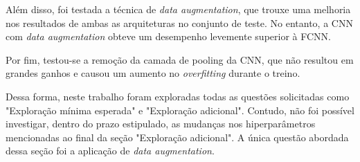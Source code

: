 \documentclass[12pt]{article}
\begin{document}
Além disso, foi testada a técnica de \textit{data augmentation}, que trouxe uma melhoria nos resultados de ambas as arquiteturas no conjunto de teste. No entanto, a CNN com \textit{data augmentation} obteve um desempenho levemente superior à FCNN.

Por fim, testou-se a remoção da camada de pooling da CNN, que não resultou em grandes ganhos e causou um aumento no \textit{overfitting} durante o treino.

Dessa forma, neste trabalho foram exploradas todas as questões solicitadas como "Exploração mínima esperada" e "Exploração adicional". Contudo, não foi possível investigar, dentro do prazo estipulado, as mudanças nos hiperparâmetros mencionadas ao final da seção "Exploração adicional". A única questão abordada dessa seção foi a aplicação de \textit{data augmentation}.



\end{document}
